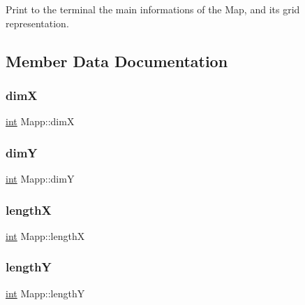 Print to the terminal the main informations of the Map, and its grid representation. 



\subsection{Member Data Documentation}
\mbox{\label{class_mapp_aeb3ba1ee2b2ac64b01a459b85610f524}} 
\subsubsection{\texorpdfstring{dimX}{dimX}}
{\footnotesize\ttfamily \mbox{\hyperlink{draw_8hh_aa620a13339ac3a1177c86edc549fda9b}{int}} Mapp\+::dimX\hspace{0.3cm}{\ttfamily [protected]}}

\mbox{\label{class_mapp_a7d830edb47e7a9b8d2574e53150a906c}} 
\subsubsection{\texorpdfstring{dimY}{dimY}}
{\footnotesize\ttfamily \mbox{\hyperlink{draw_8hh_aa620a13339ac3a1177c86edc549fda9b}{int}} Mapp\+::dimY\hspace{0.3cm}{\ttfamily [protected]}}

\mbox{\label{class_mapp_add62ddc7c9bf47dcf3dc8916dc58d41c}} 
\subsubsection{\texorpdfstring{lengthX}{lengthX}}
{\footnotesize\ttfamily \mbox{\hyperlink{draw_8hh_aa620a13339ac3a1177c86edc549fda9b}{int}} Mapp\+::lengthX\hspace{0.3cm}{\ttfamily [protected]}}

\mbox{\label{class_mapp_ad108cf6f9d0fa2f7b24405938dd7f74c}} 
\subsubsection{\texorpdfstring{lengthY}{lengthY}}
{\footnotesize\ttfamily \mbox{\hyperlink{draw_8hh_aa620a13339ac3a1177c86edc549fda9b}{int}} Mapp\+::lengthY\hspace{0.3cm}{\ttfamily [protected]}}

